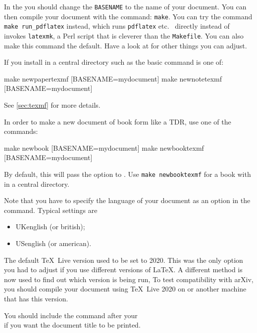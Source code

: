 In the  you should change the \texttt{BASENAME} to the name of your document.
You can then compile your document with the command: \texttt{make}.
You can try the command \texttt{make run\_pdflatex} instead,
which runs \texttt{pdflatex} etc. \ directly
instead of invokes \texttt{latexmk}, a Perl script that is cleverer than the \texttt{Makefile}.
You can also make this command the default.
Have a look at  for other things you can adjust.

If you install  in a central directory such as  the basic command is one of:
%
\begin{bashlisting}
make newpapertexmf [BASENAME=mydocument]
make newnotetexmf [BASENAME=mydocument]
\end{bashlisting}
%
See \cref{sec:texmf} for more details.

In order to make a new document of book form like a TDR, use one of the commands:
%
\begin{bashlisting}
make newbook [BASENAME=mydocument]
make newbooktexmf [BASENAME=mydocument]
\end{bashlisting}
%
By default, this will pass the option  to .
Use \verb|make newbooktexmf| for a book with  in a central directory.

Note that you have to specify the language of your document as an option in the
 command. Typical settings are
\begin{itemize}
\item UKenglish (or british);
\item USenglish (or american).
\end{itemize}

 The default \TeX\ Live version used to be set to 2020.
This was the only option you had to adjust if you use different versions of \LaTeX.
A different method is now used to find out which version is being run,
To test compatibility with arXiv, you should compile your document using
\TeX\ Live 2020 on  or another machine that has this version.

 You should include the command  after your\\
\verb|| if you want the document title to be printed.

